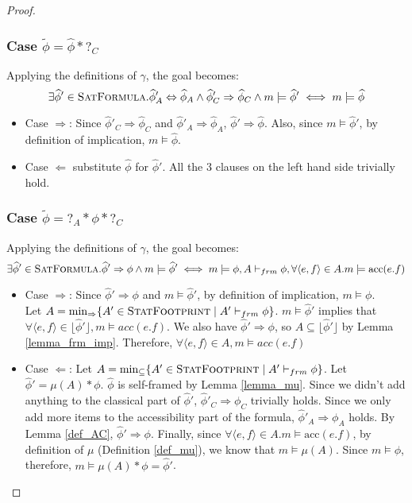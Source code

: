 \documentclass {article}
\newcommand{\fphi}{\widehat{\phi}}
\newcommand{\tphi}{\widetilde{\phi}}
\newcommand{\acc}[1]{\text{acc}(#1)}
\newcommand{\imp}{\Rightarrow}
\newcommand{\consistent}{\models}
\newcommand{\frm}{\vdash_{frm}}
\newcommand{\satdef}{\textsc{SatFormula}}
\newcommand{\statfprint}{\textsc{StatFootprint}}
\begin{document}
\begin{proof}
 \subsubsection*{Case $\tphi =  \fphi \ast ?_C$}
 Applying the definitions of $\gamma$, the goal becomes: $$\exists \fphi' \in 
\satdef. \fphi'_A \Leftrightarrow \fphi_A \wedge \fphi'_C \Rightarrow \fphi_C \wedge m \consistent  \fphi' \iff m \consistent \fphi$$
 \begin{itemize}
     \item Case $\Rightarrow$: Since $\fphi'_C \Rightarrow \fphi_C$ and $\fphi'_A \Rightarrow \fphi_A$, $\fphi' \Rightarrow \fphi$. Also, since $m \consistent \fphi'$, by definition of implication, $m \consistent \fphi$.
     \item Case $\Leftarrow$ substitute $\fphi$ for $\fphi'$.  All the 3 clauses on the left hand side trivially hold.
 \end{itemize} 
 
\subsubsection*{Case $\tphi = ?_A \ast \phi \ast ?_C$}
 Applying the definitions of $\gamma$, the goal becomes: $$\exists \fphi' \in 
\satdef. \fphi' \Rightarrow \phi \wedge m \consistent  \fphi' \iff m \consistent \phi, A \frm \phi,\forall \langle e,f\rangle  \in A. m \consistent \acc{e.f}$$
 \begin{itemize}
    \item Case $\Rightarrow$: Since $\fphi' \Rightarrow \phi$ and $m \consistent \fphi'$, by definition of implication, $m \consistent \phi$.\\ 
Let $A = \min_{\imp}\{A' \in \statfprint \mid A' \frm \phi\}$. $m \consistent \fphi'$ implies that $\forall \langle e,f\rangle  \in \lfloor \fphi' \rfloor, m \consistent acc(e.f)$. We also have $\fphi' \Rightarrow \phi$, so $A \subseteq \lfloor \fphi' \rfloor$ by Lemma \ref{lemma_frm_imp}. Therefore, $\forall \langle e,f\rangle  \in A, m \consistent acc(e.f)$
     \item Case $\Leftarrow$: Let $A = \min_{\subseteq}\{A' \in \statfprint \mid A' \frm \phi\}$. Let $\fphi' = \mu(A) \ast \phi$. $\fphi$ is self-framed by Lemma \ref{lemma_mu}. Since we didn't add anything to the classical part of $\fphi'$, $\fphi'_C \imp \phi_C$ trivially holds. Since we only add more items to the accessibility part of the formula, $\fphi'_A \Rightarrow \phi_A$ holds. By Lemma \ref{def_AC}, $\fphi' \imp \phi$. Finally, since $\forall \langle e,f\rangle  \in A. m \consistent \acc{e.f}$, by definition of $\mu$ (Definition \ref{def_mu}), we know that $m \consistent \mu(A)$. Since $m \consistent \phi$, therefore, $m \consistent \mu(A) * \phi = \fphi'$.\\
 \end{itemize}  
\end{proof}
\end{document}
